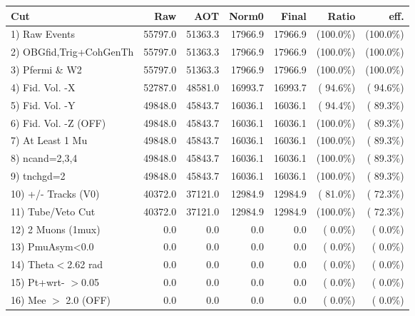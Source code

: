  \begin{table}[h!]\centering
 \begin{tabular}{||l||r|r|r|r|r|r||}
 \hline
 \hline
 Cut & Raw & AOT & Norm0 & Final & Ratio & eff.       \\
 \hline
  1) Raw Events           &      55797.0 &      51363.3 &      17966.9 &      17966.9 & (100.0\%) & (100.0\%) \\
  2) OBGfid,Trig+CohGenTh &      55797.0 &      51363.3 &      17966.9 &      17966.9 & (100.0\%) & (100.0\%) \\
  3) Pfermi \& W2         &      55797.0 &      51363.3 &      17966.9 &      17966.9 & (100.0\%) & (100.0\%) \\
  4) Fid. Vol. -X         &      52787.0 &      48581.0 &      16993.7 &      16993.7 & ( 94.6\%) & ( 94.6\%) \\
  5) Fid. Vol. -Y         &      49848.0 &      45843.7 &      16036.1 &      16036.1 & ( 94.4\%) & ( 89.3\%) \\
  6) Fid. Vol. -Z (OFF)   &      49848.0 &      45843.7 &      16036.1 &      16036.1 & (100.0\%) & ( 89.3\%) \\
  7) At Least 1 Mu        &      49848.0 &      45843.7 &      16036.1 &      16036.1 & (100.0\%) & ( 89.3\%) \\
  8) ncand=2,3,4          &      49848.0 &      45843.7 &      16036.1 &      16036.1 & (100.0\%) & ( 89.3\%) \\
  9) tnchgd=2             &      49848.0 &      45843.7 &      16036.1 &      16036.1 & (100.0\%) & ( 89.3\%) \\
 10) +/- Tracks (V0)      &      40372.0 &      37121.0 &      12984.9 &      12984.9 & ( 81.0\%) & ( 72.3\%) \\
 11) Tube/Veto Cut        &      40372.0 &      37121.0 &      12984.9 &      12984.9 & (100.0\%) & ( 72.3\%) \\
 12) 2 Muons (1mux)       &          0.0 &          0.0 &          0.0 &          0.0 & (  0.0\%) & (  0.0\%) \\
 13) PmuAsym<0.0          &          0.0 &          0.0 &          0.0 &          0.0 & (  0.0\%) & (  0.0\%) \\
 14) Theta$<$2.62 rad     &          0.0 &          0.0 &          0.0 &          0.0 & (  0.0\%) & (  0.0\%) \\
 15) Pt+wrt- $>$0.05      &          0.0 &          0.0 &          0.0 &          0.0 & (  0.0\%) & (  0.0\%) \\
 16) Mee $>$ 2.0  (OFF)   &          0.0 &          0.0 &          0.0 &          0.0 & (  0.0\%) & (  0.0\%) \\

\end{tabular}
\end{table}
